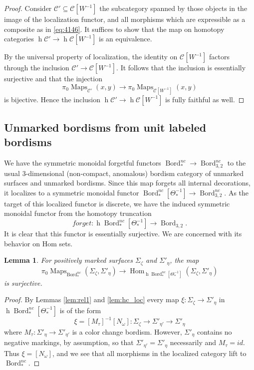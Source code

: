 \documentclass[reqno]{amsart}
\newtheorem{lemma}{Lemma}[section]
\theoremstyle{definition}
\newcommand{\msc}[1]{\mathscr{#1}}
\newcommand{\opn}[1]{\operatorname{#1}}
\DeclareMathOperator{\Hom}{Hom}
\DeclareMathOperator{\Maps}{Maps}
\DeclareMathOperator{\Bord}{Bord}
\renewcommand{\1}{\mathbf{1}}
\begin{document}
\begin{proof}
Consider $\msc{C}'\subseteq \msc{C}[W^{-1}]$ the subcategory spanned by those objects in the image of the localization functor, and all morphisms which are expressible as a composite as in \eqref{eq:4146}. It suffices to show that the map on homotopy categories $\opn{h}\msc{C}'\to \opn{h}\msc{C}[W^{-1}]$ is an equivalence.
\par

By the universal property of localization, the identity on $\msc{C}[W^{-1}]$ factors through the inclusion $\msc{C}'\to \msc{C}[W^{-1}]$.  It follows that the inclusion is essentially surjective and that the injection
\[
\pi_0\Maps_{\msc{C}'}(x,y)\to \pi_0\Maps_{\msc{C}[W^{-1}]}(x,y)
\]
is bijective. Hence the inclusion $\opn{h}\msc{C}'\to \opn{h}\msc{C}[W^{-1}]$ is fully faithful as well.
\end{proof}

\subsection{Unmarked bordisms from unit labeled bordisms}

We have the symmetric monoidal forgetful functors $\Bord_{\ast}^{nc}\to \Bord_{3,2}^{nc}$ to the usual $3$-dimensional (non-compact, anomalous) bordism category of unmarked surfaces and unmarked bordisms.  Since this map forgets all internal decorations, it localizes to a symmetric monoidal functor $\Bord_{\ast}^{nc}[\Theta_{\ast}^{-1}]\to \Bord_{3,2}^{nc}$. As the target of this localized functor is discrete, we have the induced symmetric monoidal functor from the homotopy truncation
\[
forget:\opn{h}\Bord_{\ast}^{nc}[\Theta^{-1}_{\ast}]\to \Bord_{3,2}.
\]
It is clear that this functor is essentially surjective.  We are concerned with its behavior on Hom sets.

\begin{lemma}\label{lem:4187}
For positively marked surfaces $\Sigma_{\zeta}$ and $\Sigma'_{\eta}$, the map
\[
\pi_0\Maps_{\Bord_{\ast}^{nc}}(\Sigma_{\zeta},\Sigma'_{\eta})\to \Hom_{\opn{h}\Bord_{\ast}^{nc}[\Theta_{\ast}^{-1}]}(\Sigma_{\zeta},\Sigma'_{\eta})
\]
is surjective.
\end{lemma}

\begin{proof}
By Lemmas \ref{lem:rel1} and \ref{lem:hc_loc} every map $\xi:\Sigma_{\zeta}\to \Sigma'_{\eta}$ in $\opn{h}\Bord_{\ast}^{nc}[\Theta^{-1}_{\ast}]$ is of the form
\[
\xi=[M_{\tau}]^{-1}[N_{\omega}]:\Sigma_{\zeta}\to \Sigma'_{\eta'}\to \Sigma'_{\eta}
\]
where $M_{\tau}:\Sigma'_{\eta}\to \Sigma'_{\eta'}$ is a color change bordism.  However, $\Sigma'_{\eta}$ contains no negative markings, by assumption, so that $\Sigma'_{\eta'}=\Sigma'_{\eta}$ necessarily and $M_{\tau}=id$.  Thus $\xi=[N_{\omega}]$, and we see that all morphisms in the localized category lift to $\Bord_{\ast}^{nc}$.
\end{proof}
\end{document}
